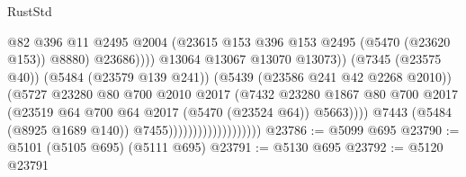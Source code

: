 \begin{lexlean}{RustStd}
\begin{coremodule}
                                                        @82
                                                        @396
                                                        @11
                                                        @2495
                                                        @2004
                                                        (@23615
                                                          @153
                                                          @396
                                                          @153
                                                          @2495
                                                          (@5470 (@23620 @153))
                                                          @8880)
                                                        @23686))))
                                                @13064
                                                @13067
                                                @13070
                                                @13073))
                                            (@7345 (@23575 @40))
                                            (@5484 (@23579 @139 @241))
                                            (@5439 (@23586 @241 @42 @2268 @2010))
                                            (@5727
                                              @23280
                                              @80
                                              @700
                                              @2010
                                              @2017
                                              (@7432
                                                @23280
                                                @1867
                                                @80
                                                @700
                                                @2017
                                                (@23519
                                                  @64
                                                  @700
                                                  @64
                                                  @2017
                                                  (@5470 (@23524 @64))
                                                  @5663))))
                                          @7443
                                          (@5484 (@8925 @1689 @140))
                                          @7455)))))))))))))))))))
@23786 := @5099 @695
@23790 := @5101 (@5105 @695) (@5111 @695)
@23791 := @5130 @695
@23792 := @5120 @23791

\end{coremodule}
\end{lexlean}
